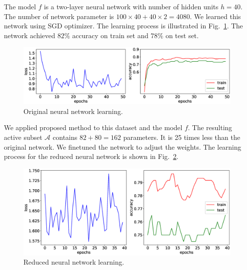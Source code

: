 \documentclass[a4paper,12pt]{article}
\theoremstyle{plain} %
\theoremstyle{definition} %
\theoremstyle{remark} %
\newcommand{\cA}{\mathcal{A}}
\begin{document}
	The model $f$ is a two-layer neural network with number of hidden units $h=40$.
	The number of network parameter is $100 \times  40 + 40 \times 2 = 4080.$
	We learned this network using SGD optimizer.
	The learning process is illustrated in Fig.~\ref{fig:learning_orig}.
	The network achieved $82\%$ accuracy on train set and $78\%$ on test set.
	
	\begin{figure}[h]
		\centering
		\includegraphics[width=\linewidth]{figs/orig_net.eps}
		\caption{Original neural network learning.}
		\label{fig:learning_orig}
	\end{figure}

	We applied proposed method to this dataset and the model $f$. The resulting active subset $\cA$ contains $82 + 80 = 162$ parameters. It is 25 times less than the original network.
	We finetuned the network to adjust the weights.
	The learning process for the reduced neural network is shown in Fig.~\ref{fig:learning_reduced}.

	\begin{figure}[h]
		\centering
		\includegraphics[width=\linewidth]{figs/reduced_net.eps}
		\caption{Reduced neural network learning.}
		\label{fig:learning_reduced}
	\end{figure}
	
\end{document}

